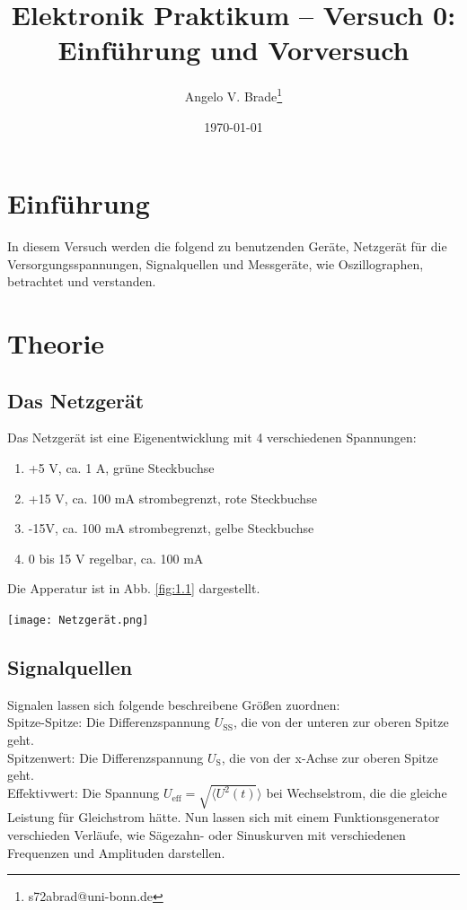\documentclass[10pt]{article}
\title{Elektronik Praktikum -- Versuch 0: Einführung und Vorversuch}
\author[1]{Angelo V. Brade\thanks{s72abrad@uni-bonn.de}}
\affil[1]{Rheinische Friedrich-Wilhelms-Universität Bonn}
\date{\today}
\newenvironment{Figure}
  {\par\medskip\noindent\minipage{\linewidth}}
  {\endminipage\par\medskip}
\begin{document}
\maketitle
\newpage

\tableofcontents
\newpage


\pagestyle{fancy}
\fancyhead[R]{\thepage}
\fancyhead[L]{\leftmark}


\begin{multicols}{2}
	\section{\large Einführung}
	In diesem Versuch werden die folgend zu benutzenden Geräte, Netzgerät für die Versorgungsspannungen, Signalquellen und Messgeräte, wie Oszillographen, betrachtet und verstanden.
	\section{\large Theorie}
	\subsection{Das Netzgerät}
	Das Netzgerät ist eine Eigenentwicklung mit 4 verschiedenen Spannungen:
	\begin{enumerate}[itemsep=0.01mm]
		\item +5 V, ca. 1 A, grüne Steckbuchse
		\item +15 V, ca. 100 mA strombegrenzt, rote Steckbuchse
		\item -15V, ca. 100 mA strombegrenzt, gelbe Steckbuchse
		\item 0 bis 15 V regelbar, ca. 100 mA
	\end{enumerate}
	Die Apperatur ist in Abb. \ref{fig:1.1} dargestellt.
	\begin{Figure}
		\centering
		\texttt{[image: Netzgerät.png]}
		\label{fig:1.1}
	\end{Figure}
	\subsection{Signalquellen}
	Signalen lassen sich folgende beschreibene Größen zuordnen:\\
	Spitze-Spitze: Die Differenzspannung \(U_{\text{SS}}\), die von der unteren zur oberen Spitze geht.\\
	Spitzenwert: Die Differenzspannung \(U_{\text{S}}\), die von der x-Achse zur oberen Spitze geht.\\
	Effektivwert: Die Spannung \(U_{\text{eff}}=\sqrt{\langle U^2(t)}\rangle\) bei Wechselstrom, die die gleiche Leistung für Gleichstrom hätte.
	Nun lassen sich mit einem Funktionsgenerator verschieden Verläufe, wie Sägezahn- oder Sinuskurven mit verschiedenen Frequenzen und Amplituden darstellen.

\end{multicols}
\end{document}
